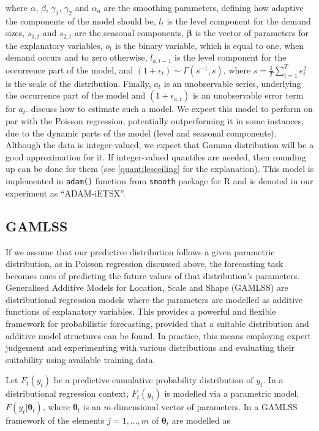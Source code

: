 \documentclass[]{elsarticle} %
\begin{document}
where \(\alpha\), \(\beta\), \(\gamma_1\), \(\gamma_2\) and \(\alpha_a\) are the smoothing parameters, defining how adaptive the components of the model should be, \(l_t\) is the level component for the demand sizes, \(s_{1,t}\) and \(s_{2,t}\) are the seasonal components, \(\boldsymbol{\beta}\) is the vector of parameters for the explanatory variables, \(o_t\) is the binary variable, which is equal to one, when demand occurs and to zero otherwise, \(l_{a,t-1}\) is the level component for the occurrence part of the model, and \(\left(1+\epsilon_t \right) \sim \Gamma(s^{-1}, s)\), where \(s=\frac{1}{T} \sum_{t=1}^{T} e_{t}^2\) is the scale of the distribution. Finally, \(a_t\) is an unobservable series, underlying the occurrence part of the model and \((1 + \epsilon_{a,t})\) is an unobservable error term for \(a_t\). \citet{Svetunkov2019a} discuss how to estimate such a model. We expect this model to perform on par with the Poisson regression, potentially outperforming it in some instances, due to the dynamic parts of the model (level and seasonal components). Although the data is integer-valued, we expect that Gamma distribution will be a good approximation for it. If integer-valued quantiles are needed, then rounding up can be done for them (see \ref{quantilesceiling} for the explanation). This model is implemented in \texttt{adam()} function from \texttt{smooth} package \citep{Svetunkov2021Smooth} for R and is denoted in our experiment as ``ADAM-iETSX''.

\hypertarget{gamlss}{%
\subsection{GAMLSS}\label{gamlss}}

If we assume that our predictive distribution follows a given parametric distribution, as in Poisson regression discussed above, the forecasting task becomes ones of predicting the future values of that distribution's parameters. Generalised Additive Models for Location, Scale and Shape (GAMLSS) are distributional regression models where the parameters are modelled as additive functions of explanatory variables. This provides a powerful and flexible framework for probabilistic forecasting, provided that a suitable distribution and additive model structures can be found. In practice, this means employing expert judgement and experimenting with various distributions and evaluating their suitability using available training data.

Let \(F_t(y_t)\) be a predictive cumulative probability distribution of \(y_t\). In a distributional regression context, \(F_t(y_t)\) is modelled via a parametric model, \(F(y_t|\bm \theta_t)\), where \(\bm \theta_t\) is an \(m\)-dimensional vector of parameters. In a GAMLSS framework of \citet{Rigby2005} the elements \(j=1,...,m\) of \(\bm \theta_t\) are modelled as
\end{document}
